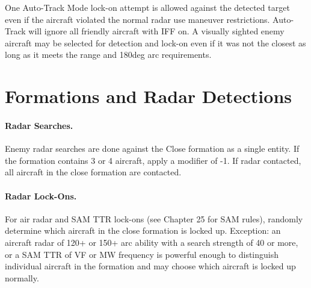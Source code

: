 \begin{advancedrules}
One Auto-Track Mode lock-on attempt is allowed against the detected target even if the aircraft violated the normal radar use maneuver restrictions. Auto-Track will ignore all friendly aircraft with IFF on. A visually sighted enemy aircraft may be selected for detection and lock-on even if it was not the closest as long as it meets the range and 180{deg} arc requirements. 


\section{Formations and Radar Detections}

\paragraph{Radar Searches.} Enemy radar searches are done against the Close formation as a single entity. If the formation contains 3 or 4 aircraft, apply a modifier of -1. If radar contacted, all aircraft in the close formation are contacted.

\paragraph{Radar Lock-Ons.} For air radar and SAM TTR lock-ons (see Chapter 25 for SAM rules), randomly determine which aircraft in the close formation is locked up. Exception: an aircraft radar of 120+ or 150+ arc ability with a search strength of 40 or more, or a SAM TTR of VF or MW frequency is powerful enough to distinguish individual aircraft in the formation and may choose which aircraft is locked up normally.

\end{advancedrules}

